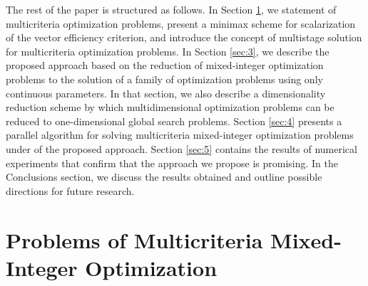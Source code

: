 \documentclass{svproc}
\begin{document}
The rest of the paper is structured as follows. In Section \ref{sec:2}, we statement of multicriteria optimization problems, present a minimax scheme for scalarization of the vector efficiency criterion, and introduce the concept of multistage solution for multicriteria optimization problems. In Section \ref{sec:3}, we describe the proposed approach based on the reduction of mixed-integer optimization problems to the solution of a family of optimization problems using only continuous parameters. In that section, we also describe a dimensionality reduction scheme by which multidimensional optimization problems can be reduced to one-dimensional global search problems. Section \ref{sec:4} presents a parallel algorithm for solving multicriteria mixed-integer optimization problems under of the proposed approach. Section \ref{sec:5} contains the results of numerical experiments that confirm that the approach we propose is promising. In the Conclusions section, we discuss the results obtained and outline possible directions for future research.

\section{Problems of Multicriteria Mixed-Integer Optimization}\label{sec:2}
\end{document}
